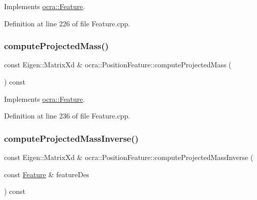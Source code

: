 Implements \hyperlink{classocra_1_1Feature_a44e11dd349e92971fefebff354e7214b}{ocra\+::\+Feature}.



Definition at line 226 of file Feature.\+cpp.

\hypertarget{classocra_1_1PositionFeature_aed6469ba39dae7d5ed76ee6f78ee8b5e}{}\label{classocra_1_1PositionFeature_aed6469ba39dae7d5ed76ee6f78ee8b5e} 
\subsubsection{\texorpdfstring{compute\+Projected\+Mass()}{computeProjectedMass()}\hspace{0.1cm}{\footnotesize\ttfamily [2/2]}}
{\footnotesize\ttfamily const Eigen\+::\+Matrix\+Xd \& ocra\+::\+Position\+Feature\+::compute\+Projected\+Mass (\begin{DoxyParamCaption}{ }\end{DoxyParamCaption}) const\hspace{0.3cm}{\ttfamily [virtual]}}



Implements \hyperlink{classocra_1_1Feature_a99ac023809c0cf34b5d582537934b08c}{ocra\+::\+Feature}.



Definition at line 236 of file Feature.\+cpp.

\hypertarget{classocra_1_1PositionFeature_a30163c57355643a81bd119cd23a46cc1}{}\label{classocra_1_1PositionFeature_a30163c57355643a81bd119cd23a46cc1} 
\subsubsection{\texorpdfstring{compute\+Projected\+Mass\+Inverse()}{computeProjectedMassInverse()}\hspace{0.1cm}{\footnotesize\ttfamily [1/2]}}
{\footnotesize\ttfamily const Eigen\+::\+Matrix\+Xd \& ocra\+::\+Position\+Feature\+::compute\+Projected\+Mass\+Inverse (\begin{DoxyParamCaption}\item[{const \hyperlink{classocra_1_1Feature}{Feature} \&}]{feature\+Des }\end{DoxyParamCaption}) const\hspace{0.3cm}{\ttfamily [virtual]}}



